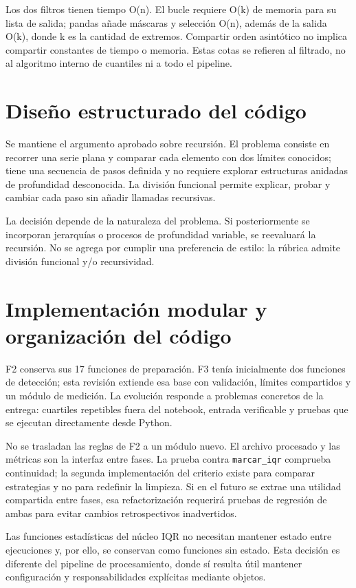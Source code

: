 \documentclass[11pt,letterpaper]{article}
\begin{document}
Los dos filtros tienen tiempo O(n). El bucle requiere O(k) de memoria para su lista de salida;
pandas añade máscaras y selección O(n), además de la salida O(k), donde k es la cantidad de
extremos. Compartir orden asintótico no implica compartir constantes de tiempo o memoria.
Estas cotas se refieren al filtrado, no al algoritmo interno de cuantiles ni a todo el pipeline.

\section{Diseño estructurado del código}
Se mantiene el argumento aprobado sobre recursión. El problema consiste en recorrer una
serie plana y comparar cada elemento con dos límites conocidos; tiene una secuencia de
pasos definida y no requiere explorar estructuras anidadas de profundidad desconocida.
La división funcional permite explicar, probar y cambiar cada paso sin añadir llamadas recursivas.

La decisión depende de la naturaleza del problema. Si posteriormente se incorporan jerarquías
o procesos de profundidad variable, se reevaluará la recursión. No se agrega por cumplir una
preferencia de estilo: la rúbrica admite división funcional y/o recursividad.

\section{Implementación modular y organización del código}
F2 conserva sus 17 funciones de preparación. F3 tenía inicialmente dos funciones de detección;
esta revisión extiende esa base con validación, límites compartidos y un módulo de medición.
La evolución responde a problemas concretos de la entrega: cuartiles repetibles fuera del
notebook, entrada verificable y pruebas que se ejecutan directamente desde Python.

No se trasladan las reglas de F2 a un módulo nuevo. El archivo procesado y las métricas son
la interfaz entre fases. La prueba contra \texttt{marcar\_iqr} comprueba continuidad; la segunda
implementación del criterio existe para comparar estrategias y no para redefinir la limpieza.
Si en el futuro se extrae una utilidad compartida entre fases, esa refactorización requerirá
pruebas de regresión de ambas para evitar cambios retrospectivos inadvertidos.

Las funciones estadísticas del núcleo IQR no necesitan mantener estado entre ejecuciones y,
por ello, se conservan como funciones sin estado. Esta decisión es diferente del pipeline de
procesamiento, donde sí resulta útil mantener configuración y responsabilidades explícitas
mediante objetos.
\end{document}
